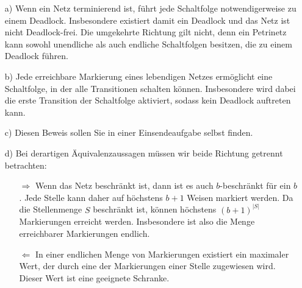 \begin{enumerate}
	\item[a)] Wenn ein Netz terminierend ist, führt jede Schaltfolge notwendigerweise zu einem Deadlock. Insbesondere existiert damit ein Deadlock und das Netz ist nicht Deadlock-frei. Die umgekehrte Richtung gilt nicht, denn ein Petrinetz kann sowohl unendliche als auch endliche Schaltfolgen besitzen, die zu einem Deadlock führen.
	
	\item[b)] Jede erreichbare Markierung eines lebendigen Netzes ermöglicht eine Schalt\-folge, in der alle Transitionen schalten können. Insbesondere wird dabei die erste Transition der Schaltfolge aktiviert, sodass kein Deadlock auftreten kann.
	
	\item[c)] Diesen Beweis sollen Sie in einer Einsendeaufgabe selbst finden.
	
	\item[d)] Bei derartigen Äquivalenzaussagen müssen wir beide Richtung getrennt betrachten:
	\begin{enumerate}
		\item[$\Rightarrow$] Wenn das Netz beschränkt ist, dann ist es auch $b$-beschränkt für ein $b$. \linebreak
		Jede Stelle kann daher auf höchstens $b+1$ Weisen markiert werden. Da die Stellenmenge $S$ beschränkt ist, können höchstens ${(b+1)}^{|S|}$ Markierungen erreicht werden. Insbesondere ist also die Menge erreichbarer Markierungen endlich.
		\item[$\Leftarrow$] In einer endlichen Menge von Markierungen existiert ein maximaler Wert, der durch eine der Markierungen einer Stelle zugewiesen wird. Dieser Wert ist eine geeignete Schranke.
	\end{enumerate}
\end{enumerate}
